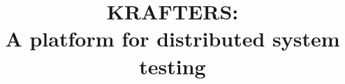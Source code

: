 \documentclass[11pt,a4paper,twoside,openright]{book}
\begin{document}
\title{KRAFTERS: \\A platform for distributed system testing}
\providecommand{\autore}{Federici Marco, Bortoli Gianluca, Taneburgo Gianvito}
\providecommand{\principaladviser}{Alberto Montresor}
\providecommand{\annoacc}{2015-2016}

\titlep

\frontmatter
{}

\tableofcontents

\clearpage
\pagestyle{headings}
\renewcommand{\chaptermark}[1]{\markboth{{\chaptername}\ \thechapter.\hspace{1em}#1}{}}

\mainmatter







\renewcommand{\chaptermark}[1]{\markboth{{\appendixname}\ \thechapter.\hspace{1em}#1}{}}

%

%
%
\end{document}
